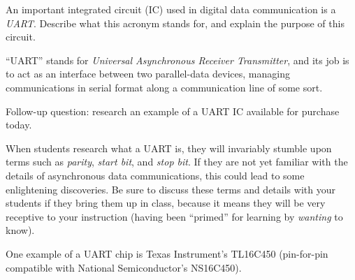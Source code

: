 

An important integrated circuit (IC) used in digital data communication is a {\it UART}.  Describe what this acronym stands for, and explain the purpose of this circuit.







``UART'' stands for {\it Universal Asynchronous Receiver Transmitter}, and its job is to act as an interface between two parallel-data devices, managing communications in serial format along a communication line of some sort.

\vskip 10pt

Follow-up question: research an example of a UART IC available for purchase today.







When students research what a UART is, they will invariably stumble upon terms such as {\it parity}, {\it start bit}, and {\it stop bit}.  If they are not yet familiar with the details of asynchronous data communications, this could lead to some enlightening discoveries.  Be sure to discuss these terms and details with your students if they bring them up in class, because it means they will be very receptive to your instruction (having been ``primed'' for learning by {\it wanting} to know).

\vskip 10pt

One example of a UART chip is Texas Instrument's TL16C450 (pin-for-pin compatible with National Semiconductor's NS16C450).




